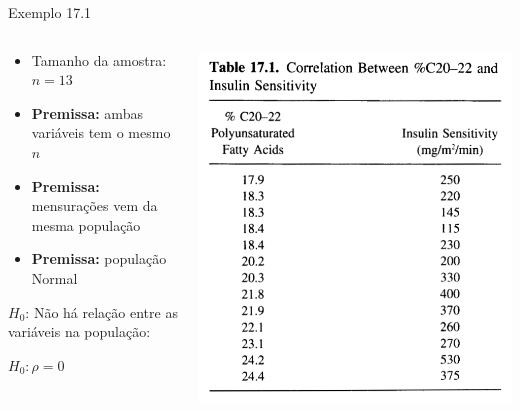 \documentclass{beamer}
\begin{document}
\begin{frame}{\scriptsize Exemplo 17.1}
  \begin{columns}
    \begin{column}{5cm}
      \begin{itemize}
        \footnotesize
      \item Tamanho da amostra: $n=13$
      \bigskip
      \item {\bf Premissa:} ambas variáveis tem o mesmo $n$
      \item {\bf Premissa:} mensurações vem da mesma população
      \item {\bf Premissa:} população Normal
      \end{itemize}
      \bigskip
      \begin{block}{}
        \footnotesize
        $H_0$: Não há relação entre as variáveis na população:

        \medskip
        $H_0: \rho = 0$
      \end{block}
    \end{column}
    \begin{column}{5cm}
      \includegraphics[height=0.8\textheight]{Cap17/table}
    \end{column}
  \end{columns}
\end{frame}
\end{document}

